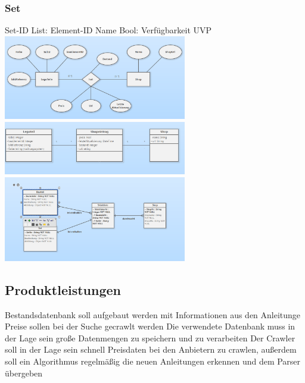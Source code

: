 \subsubsection{Set}
Set-ID \newline
List: Element-ID \newline
Name \newline
Bool: Verfügbarkeit \newline
UVP \newline  \newline
\includegraphics[width=8cm]{pictures/chen1.png} \newline  \newline
\includegraphics[width=8cm]{pictures/klassendiagramm2.png}  \newline  \newline
\includegraphics[width=8cm]{pictures/klassendiagramm.png} 

\subsection{Produktleistungen}
Bestandsdatenbank soll aufgebaut werden mit Informationen aus den Anleitunge \newline
Preise sollen bei der Suche gecrawlt werden \newline
Die verwendete Datenbank muss in der Lage sein große Datenmengen zu speichern und zu verarbeiten \newline
Der Crawler soll in der Lage sein schnell Preisdaten bei den Anbietern zu crawlen, außerdem soll ein Algorithmus regelmäßig die neuen Anleitungen erkennen und dem Parser übergeben \newline

